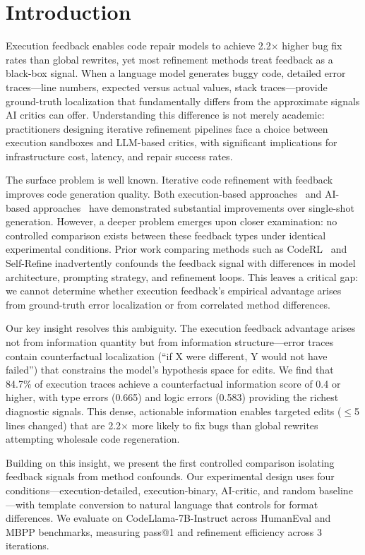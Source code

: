 \section{Introduction}
\label{sec:introduction}

Execution feedback enables code repair models to achieve 2.2$\times$ higher bug fix rates than global rewrites, yet most refinement methods treat feedback as a black-box signal. When a language model generates buggy code, detailed error traces---line numbers, expected versus actual values, stack traces---provide ground-truth localization that fundamentally differs from the approximate signals AI critics can offer. Understanding this difference is not merely academic: practitioners designing iterative refinement pipelines face a choice between execution sandboxes and LLM-based critics, with significant implications for infrastructure cost, latency, and repair success rates.

The surface problem is well known. Iterative code refinement with feedback improves code generation quality. Both execution-based approaches~\cite{chen2023self} and AI-based approaches~\cite{madaan2023self} have demonstrated substantial improvements over single-shot generation. However, a deeper problem emerges upon closer examination: no controlled comparison exists between these feedback types under identical experimental conditions. Prior work comparing methods such as CodeRL~\cite{le2022coderl} and Self-Refine inadvertently confounds the feedback signal with differences in model architecture, prompting strategy, and refinement loops. This leaves a critical gap: we cannot determine whether execution feedback's empirical advantage arises from ground-truth error localization or from correlated method differences.

Our key insight resolves this ambiguity. The execution feedback advantage arises not from information quantity but from information structure---error traces contain counterfactual localization (``if X were different, Y would not have failed'') that constrains the model's hypothesis space for edits. We find that 84.7\% of execution traces achieve a counterfactual information score of 0.4 or higher, with type errors (0.665) and logic errors (0.583) providing the richest diagnostic signals. This dense, actionable information enables targeted edits ($\leq$5 lines changed) that are 2.2$\times$ more likely to fix bugs than global rewrites attempting wholesale code regeneration.

Building on this insight, we present the first controlled comparison isolating feedback signals from method confounds. Our experimental design uses four conditions---execution-detailed, execution-binary, AI-critic, and random baseline---with template conversion to natural language that controls for format differences. We evaluate on CodeLlama-7B-Instruct across HumanEval and MBPP benchmarks, measuring pass@1 and refinement efficiency across 3 iterations.

